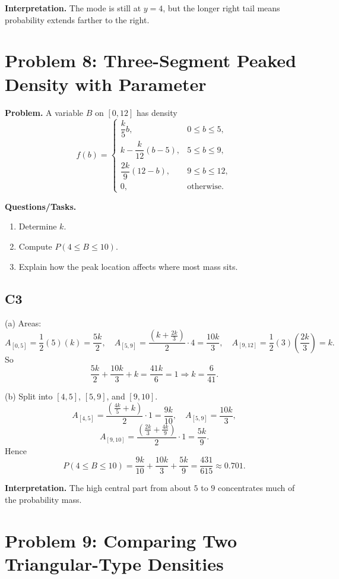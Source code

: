 \textbf{Interpretation.}
The mode is still at $y=4$, but the longer right tail means probability extends farther to the right.

\section{Problem 8: Three-Segment Peaked Density with Parameter}

\textbf{Problem.}
A variable $B$ on $[0,12]$ has density
\[
f(b)=\begin{cases}
\dfrac{k}{5}b, & 0\le b\le 5,\\
k-\dfrac{k}{12}(b-5), & 5\le b\le 9,\\
\dfrac{2k}{9}(12-b), & 9\le b\le 12,\\
0, & \text{otherwise.}
\end{cases}
\]

\textbf{Questions/Tasks.}
\begin{enumerate}
\item Determine $k$.
\item Compute $P(4\le B\le 10)$.
\item Explain how the peak location affects where most mass sits.
\end{enumerate}

\subsection*{C3}
(a) Areas:
\[
A_{[0,5]}=\frac12(5)(k)=\frac{5k}{2},
\quad
A_{[5,9]}=\frac{(k+\frac{2k}{3})}{2}\cdot4=\frac{10k}{3},
\quad
A_{[9,12]}=\frac12(3)\left(\frac{2k}{3}\right)=k.
\]
So
\[
\frac{5k}{2}+\frac{10k}{3}+k=\frac{41k}{6}=1
\Rightarrow k=\frac{6}{41}.
\]

(b) Split into $[4,5]$, $[5,9]$, and $[9,10]$.
\[
A_{[4,5]}=\frac{\left(\frac{4k}{5}+k\right)}{2}\cdot1=\frac{9k}{10},
\quad
A_{[5,9]}=\frac{10k}{3},
\]
\[
A_{[9,10]}=\frac{\left(\frac{2k}{3}+\frac{4k}{9}\right)}{2}\cdot1=\frac{5k}{9}.
\]
Hence
\[
P(4\le B\le 10)=\frac{9k}{10}+\frac{10k}{3}+\frac{5k}{9}=\frac{431}{615}\approx0.701.
\]

\textbf{Interpretation.}
The high central part from about $5$ to $9$ concentrates much of the probability mass.

\section{Problem 9: Comparing Two Triangular-Type Densities}

